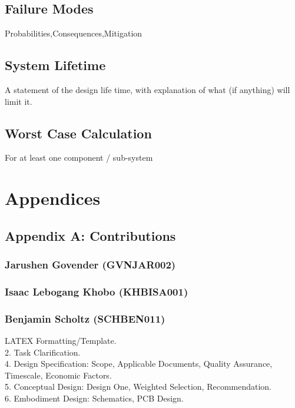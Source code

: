 \subsection{Failure Modes}
Probabilities,Consequences,Mitigation
\subsection{System Lifetime}
A statement of the design life time, with explanation of what (if anything) will limit it.
\subsection{Worst Case Calculation}
For at least one component / sub-system 



\newpage





\newpage
\section*{Appendices}
\subsection*{Appendix A: Contributions}

\subsubsection*{Jarushen Govender (GVNJAR002)}
\subsubsection*{Isaac Lebogang Khobo (KHBISA001)}
\subsubsection*{Benjamin Scholtz (SCHBEN011)}
LATEX Formatting/Template. \\
2. Task Clarification. \\
4. Design Specification: Scope, Applicable Documents, Quality Assurance, Timescale, Economic Factors. \\
5. Conceptual Design: Design One, Weighted Selection, Recommendation. \\
6. Embodiment Design: Schematics, PCB Design. \\

